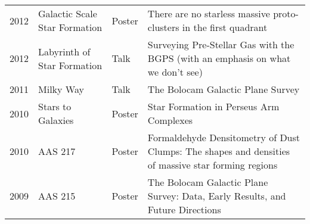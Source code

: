 \documentclass{article}
\begin{document}
\begin{tabular}{cp{1.8in}p{1.5cm}p{3.0in}}
    2012 &      Galactic Scale Star Formation  & Poster& There are no starless massive proto-clusters in the first quadrant \\
    2012 &      Labyrinth of Star Formation  &  Talk& Surveying Pre-Stellar Gas with the BGPS (with an emphasis on what we don't see) \\
    2011 &      Milky Way  & Talk& The Bolocam Galactic Plane Survey \\
    2010 &      Stars to Galaxies  & Poster& Star Formation in Perseus Arm Complexes \\
    2010 &      AAS 217  &  Poster& Formaldehyde Densitometry of Dust Clumps: The shapes and densities of massive star forming regions \\
    2009 &      AAS 215  &  Poster& The Bolocam Galactic Plane Survey: Data, Early Results, and Future Directions \\
\end{tabular}



\setlength{\extrarowheight}{7pt}
\end{document}
